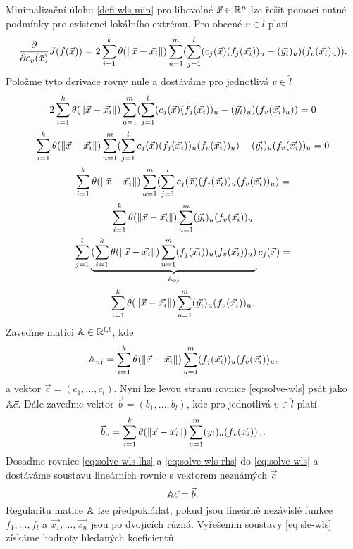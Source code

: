Minimalizační úlohu \ref{defi:wls-min} pro libovolné $\vec{x} \in \mathbb{R}^n$ lze řešit pomocí nutné podmínky pro existenci lokálního extrému. Pro obecné $v \in \hat l$ platí
\[
  \frac{\partial}{\partial c_v(\vec{x})}J(f(\vec{x})) = 2\sum_{i=1}^k\theta(\|\vec{x} - \vec{x_i}\|)\sum_{u=1}^m(\sum_{j=1}^l (c_j(\vec{x})(f_j(\vec{x_i}))_u - (\vec{y_i})_u)(f_v(\vec{x_i})_u)). 
\]
Položme tyto derivace rovny nule a dostáváme pro jednotlivá $v \in \hat l$
\begin{multline}
  \label{eq:solve-wls}
  2\sum_{i=1}^k \theta(\|\vec{x} - \vec{x_i}\|) \sum_{u=1}^m (\sum_{j=1}^l (c_j(\vec{x})(f_j(\vec{x_i}))_u - (\vec{y_i})_u)(f_v(\vec{x_i})_u)) = 0\\
  \sum_{i=1}^k \theta(\|\vec{x} - \vec{x_i}\|) \sum_{u=1}^m (\sum_{j=1}^l c_j(\vec{x})(f_j(\vec{x_i}))_u(f_v(\vec{x_i}))_u) - (\vec{y_i})_u(f_v(\vec{x_i}))_u = 0\\
  \sum_{i=1}^k \theta(\|\vec{x} - \vec{x_i}\|) \sum_{u=1}^m (\sum_{j=1}^l c_j(\vec{x})(f_j(\vec{x_i}))_u(f_v(\vec{x_i}))_u) =\\ \sum_{i=1}^k \theta(\|\vec{x} - \vec{x_i}\|) \sum_{u=1}^m (\vec{y_i})_u(f_v(\vec{x_i}))_u\\
  \sum_{j=1}^l \underbrace{(\sum_{i=1}^k \theta(\|\vec{x} - \vec{x_i}\|) \sum_{u=1}^m (f_j(\vec{x_i}))_u(f_v(\vec{x_i}))_u)}_{\mathbb{A}_{vj}}c_j(\vec{x}) =\\ \sum_{i=1}^k \theta(\|\vec{x} - \vec{x_i}\|) \sum_{u=1}^m (\vec{y_i})_u(f_v(\vec{x_i}))_u.\\
\end{multline}
Zaveďme matici $\mathbb{A} \in \mathbb{R}^{l,l}$, kde
\begin{equation}
  \label{eq:solve-wls-lhs}
  \mathbb{A}_{vj} = \sum_{i=1}^k \theta(\|\vec{x} - \vec{x_i}\|) \sum_{u=1}^m (f_j(\vec{x_i}))_u(f_v(\vec{x_i}))_u,
\end{equation}
a vektor $\vec{c} = (c_1,\dots,c_l)$. Nyní lze levou stranu rovnice \ref{eq:solve-wls} psát jako $\mathbb{A}\vec{c}$. Dále zaveďme vektor $\vec{b} = (b_1,\ldots,b_l)$, kde pro jednotlivá $v \in \hat l$ platí
\begin{equation}
  \label{eq:solve-wls-rhs}
  \vec{b}_v = \sum_{i=1}^k \theta(\|\vec{x} - \vec{x_i}\|) \sum_{u=1}^m (\vec{y_i})_u(f_v(\vec{x_i}))_u.
\end{equation}
Dosaďme rovnice \ref{eq:solve-wls-lhs} a \ref{eq:solve-wls-rhs} do \ref{eq:solve-wls} a dostáváme soustavu lineárních rovnic s vektorem neznámých $\vec{c}$
\begin{equation}
  \label{eq:sle-wls}
  \mathbb{A}\vec{c} = \vec{b}.
\end{equation}
Regularitu matice $\mathbb{A}$ lze předpokládat, pokud jsou lineárně nezávislé funkce $f_1, \ldots, f_l$ a $\vec{x_1}, \ldots, \vec{x_n}$ jsou po dvojicích různá. Vyřešením soustavy \ref{eq:sle-wls} získáme hodnoty hledaných koeficientů.

